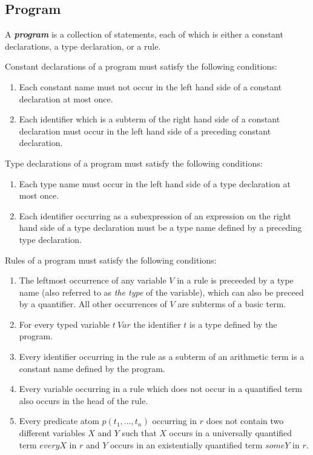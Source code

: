 \documentclass[a4paper,10pt]{article}
\begin{document}
\subsection{Program} \label{progdef}
A \textbf{\textit{program}} is a collection of statements, each of which is either a constant declarations, a
 type declaration, or a rule.

\noindent\vspace{0.2cm}

Constant declarations of a program must satisfy the following conditions:
\begin{enumerate}
\item Each constant name must not occur in the left hand side of a constant declaration at most once.
\item Each identifier which is a subterm of the right hand side of a constant declaration must occur in the left hand side of a preceding constant declaration.   

\end{enumerate}



Type declarations of a program must satisfy the following conditions:
\begin{enumerate}
\item Each type name must occur in the left hand side of a type declaration at most once.
\item Each identifier occurring as  a subexpression of an expression on the right hand side of a  type declaration must be a type name defined by a preceding type declaration. 
\end{enumerate}


Rules of a program must satisfy the following conditions:

\begin{enumerate}


\item The leftmost occurrence of any variable  $V$ in a rule is preceeded by a type name (also referred to as \textit{the type} of the variable), which can also be preceed by a quantifier.
All other occurrences of $V$ are subterms of a basic term.
\item For every typed variable $t~Var$ the identifier $t$ is a type 
 defined by the program.
\item Every identifier  occurring in the rule as a subterm of an arithmetic term is a constant name defined by the program.
\item Every variable occurring in a rule which does not  occur in a quantified term also occurs in the head of the rule.
\item Every predicate atom $p(t_1,\ldots,t_n)$ occurring in $r$ does not contain two different variables $X$ and $Y$ such that $X$ occurs in a universally quantified term $every X$ in $r$ and $Y$ occurs in an existentially quantified term $some Y$ in $r$.
\end{enumerate}
\end{document}
